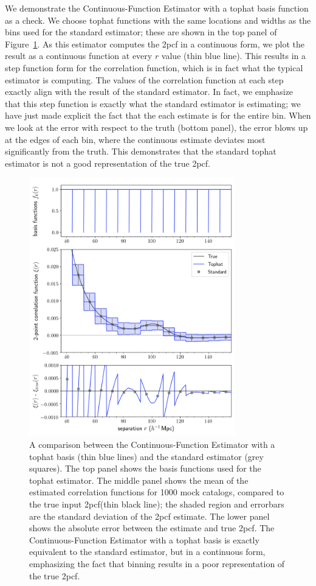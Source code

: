 \documentclass[modern]{aastex62}
\newcommand{\cf}{2pcf\xspace} %
\newcommand{\Est}{The Continuous-Function Estimator\xspace}
\newcommand{\est}{the Continuous-Function Estimator\xspace}
\begin{document}
We demonstrate \est with a tophat basis function as a check.
We choose tophat functions with the same locations and widths as the bins used for the standard estimator; these are shown in the top panel of Figure~\ref{fig:tophat}. 
As this estimator computes the \cf in a continuous form, we plot the result as a continuous function at every $r$ value (thin blue line).
This results in a step function form for the correlation function, which is in fact what the typical estimator is computing.
The values of the correlation function at each step exactly align with the result of the standard estimator.
In fact, we emphasize that this step function is exactly what the standard estimator is estimating; we have just made explicit the fact that the each estimate is for the entire bin.
When we look at the error with respect to the truth (bottom panel), the error blows up at the edges of each bin, where the continuous estimate deviates most significantly from the truth.
This demonstrates that the standard tophat estimator is not a good representation of the true \cf.

\begin{figure}[t]
\centering
    \includegraphics[width=0.8\textwidth]{xicomparison_2e-4_tophat8_theory8}
    \caption{A comparison between \est with a tophat basis (thin blue lines) and the standard estimator (grey squares). The top panel shows the basis functions used for the tophat estimator. The middle panel shows the mean of the estimated correlation functions for 1000 mock catalogs, compared to the true input \cf (thin black line); the shaded region and errorbars are the standard deviation of the \cf estimate. The lower panel shows the absolute error between the estimate and true \cf. \Est with a tophat basis is exactly equivalent to the standard estimator, but in a continuous form, emphasizing the fact that binning results in a poor representation of the true \cf.}
    \label{fig:tophat}
\end{figure}
\end{document}
